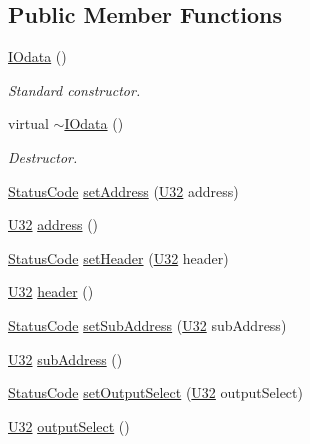 \subsection*{Public Member Functions}
\begin{DoxyCompactItemize}
\item 
\hyperlink{classIOdata_af558c1fc49af58f50c9600423dd5acd7}{IOdata} ()
\begin{DoxyCompactList}\small\item\em Standard constructor. \item\end{DoxyCompactList}\item 
virtual \hyperlink{classIOdata_a3d7cf860040702b00a925703da7c0648}{$\sim$IOdata} ()
\begin{DoxyCompactList}\small\item\em Destructor. \item\end{DoxyCompactList}\item 
\hyperlink{classStatusCode}{StatusCode} \hyperlink{classIOdata_af98cbfbc28346ebb9b64ca0203af1463}{setAddress} (\hyperlink{classIOdata_a96fb57f5fcd87b708743abd3c86a5198}{U32} address)
\item 
\hyperlink{classIOdata_a96fb57f5fcd87b708743abd3c86a5198}{U32} \hyperlink{classIOdata_afe410c86881b8c2082a08e5ce9843306}{address} ()
\item 
\hyperlink{classStatusCode}{StatusCode} \hyperlink{classIOdata_a9a850f401542d416adf061e30f7dfdd5}{setHeader} (\hyperlink{classIOdata_a96fb57f5fcd87b708743abd3c86a5198}{U32} header)
\item 
\hyperlink{classIOdata_a96fb57f5fcd87b708743abd3c86a5198}{U32} \hyperlink{classIOdata_a503396d8deb6e098c15f963e4201e01b}{header} ()
\item 
\hyperlink{classStatusCode}{StatusCode} \hyperlink{classIOdata_aeca09aa9a8c2ccc4c3a728b2ddcf4b2a}{setSubAddress} (\hyperlink{classIOdata_a96fb57f5fcd87b708743abd3c86a5198}{U32} subAddress)
\item 
\hyperlink{classIOdata_a96fb57f5fcd87b708743abd3c86a5198}{U32} \hyperlink{classIOdata_a25df48b84364a468373260f823ed9c5f}{subAddress} ()
\item 
\hyperlink{classStatusCode}{StatusCode} \hyperlink{classIOdata_a09675d3efa14ba00cc22f8ff8d463389}{setOutputSelect} (\hyperlink{classIOdata_a96fb57f5fcd87b708743abd3c86a5198}{U32} outputSelect)
\item 
\hyperlink{classIOdata_a96fb57f5fcd87b708743abd3c86a5198}{U32} \hyperlink{classIOdata_aaa410b57a4607857d45ac6a7cd013307}{outputSelect} ()

\end{DoxyCompactItemize}
